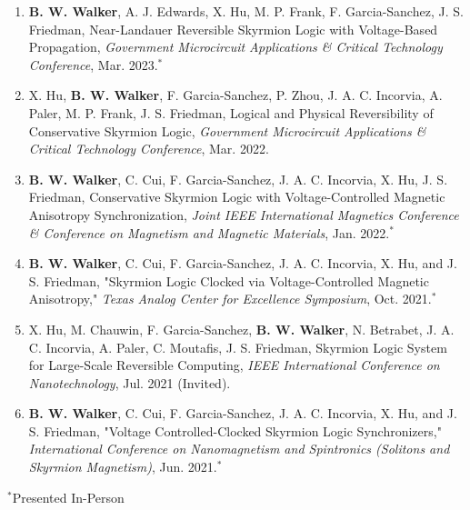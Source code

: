 \documentclass[letterpaper,11pt]{article}
\begin{document}
\begin{itemize}[leftmargin=0.15in, label={}]
{{\begin{enumerate}[leftmargin=0.15in]
          \item \small{\textbf{B. W. Walker}, A. J. Edwards, X. Hu, M. P. Frank, F. Garcia-Sanchez, J. S. Friedman, Near-Landauer Reversible Skyrmion Logic with Voltage-Based Propagation, \textit{Government Microcircuit Applications \& Critical Technology Conference}, Mar. 2023.$^{*}$}
          \item \small{X. Hu, \textbf{B. W. Walker}, F. Garcia-Sanchez, P. Zhou, J. A. C. Incorvia, A. Paler, M. P. Frank, J. S. Friedman, Logical and Physical Reversibility of Conservative Skyrmion Logic, \textit{Government Microcircuit Applications \& Critical Technology Conference}, Mar. 2022.}
          \item \small{\textbf{B. W. Walker}, C. Cui, F. Garcia-Sanchez, J. A. C. Incorvia, X. Hu, J. S. Friedman, Conservative Skyrmion Logic with Voltage-Controlled Magnetic Anisotropy Synchronization, \textit{Joint IEEE International Magnetics Conference \& Conference on Magnetism and Magnetic Materials}, Jan. 2022.$^{*}$}
          \item \small{\textbf{B. W. Walker}, C. Cui, F. Garcia-Sanchez, J. A. C. Incorvia, X. Hu, and J. S. Friedman, "Skyrmion Logic Clocked via Voltage-Controlled Magnetic Anisotropy," \textit{Texas Analog Center for Excellence Symposium}, Oct. 2021.$^{*}$}
          \item \small{X. Hu, M. Chauwin, F. Garcia-Sanchez, \textbf{B. W. Walker}, N. Betrabet, J. A. C. Incorvia, A. Paler, C. Moutafis, J. S. Friedman, Skyrmion Logic System for Large-Scale Reversible Computing, \textit{IEEE International Conference on Nanotechnology}, Jul. 2021 (Invited).}
          \item \small{\textbf{B. W. Walker}, C. Cui, F. Garcia-Sanchez, J. A. C. Incorvia, X. Hu, and J. S. Friedman, "Voltage Controlled-Clocked Skyrmion Logic Synchronizers," \textit{International Conference on Nanomagnetism and Spintronics (Solitons and Skyrmion Magnetism)}, Jun. 2021.$^{*}$}
        \end{enumerate}
        }}
     \end{itemize}
     \vspace{-15pt}\hspace{400pt}$^{*}$Presented In-Person\vspace{-15pt}
\end{document}
